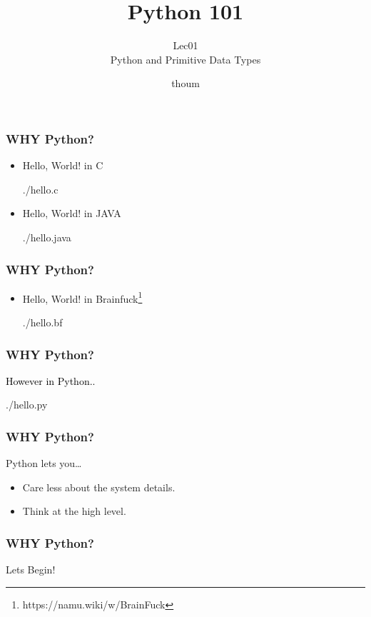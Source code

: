 \documentclass{beamer}
\title{Python 101}
\subtitle{Lec01 \\ Python and Primitive Data Types}
\author{thoum}
\begin{document}
\frame{\titlepage}

\begin{frame}
\frametitle{WHY Python?}
\begin{itemize}
    \item
    Hello, World! in C
    \begin{lstinputlisting}
      {./hello.c}
    \end{lstinputlisting}
    \item
    Hello, World! in JAVA
    \begin{lstinputlisting}
      {./hello.java}
    \end{lstinputlisting}
\end{itemize}
\end{frame}

\begin{frame}
\frametitle{WHY Python?}
\begin{itemize}
    \item
      Hello, World! in
      Brainfuck\footnote{\small{https://namu.wiki/w/BrainFuck}}
    \begin{lstinputlisting}
      {./hello.bf}
    \end{lstinputlisting}
\end{itemize}
\end{frame}

\begin{frame}
\frametitle{WHY Python?}
  \textcolor{black}{\LARGE{However in Python..}}
\end{frame}
\begin{frame}
    \begin{lstinputlisting}
      {./hello.py}
    \end{lstinputlisting}
\end{frame}

\begin{frame}
\frametitle{WHY Python?}
  {\Large{Python lets you\ldots}}
  \begin{itemize}
    \item Care less about the system details.
    \item Think at the high level.
  \end{itemize}
\end{frame}

\begin{frame}
\frametitle{WHY Python?}
  \begin{center}
  {\Large{Lets Begin!}}
  \end{center}

\end{frame}
\end{document}
